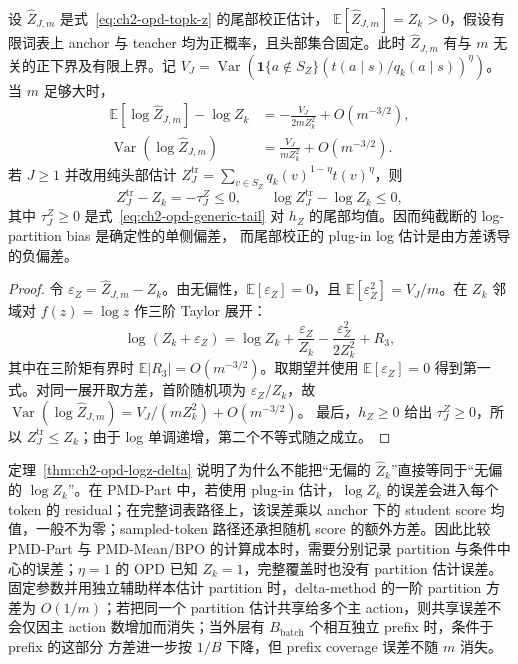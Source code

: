 \documentclass[lang=cn,scheme=chinese,openany]{../book/elegantbook}
\begin{document}
\begin{theorem}
\label{thm:ch2-opd-logz-delta}
设 $\widehat Z_{J,m}$ 是式~\eqref{eq:ch2-opd-topk-z} 的尾部校正估计， $\mathbb E[\widehat Z_{J,m}]=Z_k>0$，假设有限词表上 anchor 与 teacher 均为正概率，且头部集合固定。此时 $\widehat Z_{J,m}$ 有与 $m$ 无关的正下界及有限上界。记 $V_{J}=\operatorname{Var}(\mathbf 1\{a\notin S_Z\} (t(a\mid s)/q_k(a\mid s))^\eta)$。当 $m$ 足够大时，
\begin{align}
\mathbb E[\log\widehat Z_{J,m}]-\log Z_k
&=-\frac{V_J}{2mZ_k^2}+O(m^{-3/2}),\\
\operatorname{Var}(\log\widehat Z_{J,m})
&=\frac{V_J}{mZ_k^2}+O(m^{-3/2}).
\end{align}
若 $J\ge1$ 并改用纯头部估计 $Z_J^{\mathrm{tr}}=\sum_{v\in S_Z} q_k(v)^{1-\eta}t(v)^\eta$，则
\begin{equation}
Z_J^{\mathrm{tr}}-Z_k=-\tau_J^Z\le0,
\qquad
\log Z_J^{\mathrm{tr}}-\log Z_k\le0,
\end{equation}
其中 $\tau_J^Z\ge0$ 是式~\eqref{eq:ch2-opd-generic-tail} 对 $h_Z$ 的尾部均值。因而纯截断的 log-partition bias 是确定性的单侧偏差， 而尾部校正的 plug-in log 估计是由方差诱导的负偏差。
\end{theorem}

\begin{proof}
令 $\varepsilon_Z=\widehat Z_{J,m}-Z_k$。由无偏性，$\mathbb E[\varepsilon_Z]=0$，且 $\mathbb E[\varepsilon_Z^2]=V_J/m$。在 $Z_k$ 邻域对 $f(z)=\log z$ 作三阶 Taylor 展开：
\begin{equation}
\log(Z_k+\varepsilon_Z)=\log Z_k+\frac{\varepsilon_Z}{Z_k}
 -\frac{\varepsilon_Z^2}{2Z_k^2}+R_3,
\end{equation}
其中在三阶矩有界时 $\mathbb E|R_3|=O(m^{-3/2})$。取期望并使用 $\mathbb E[\varepsilon_Z]=0$ 得到第一式。对同一展开取方差，首阶随机项为 $\varepsilon_Z/Z_k$，故 $\operatorname{Var}(\log\widehat Z_{J,m})=V_J/(mZ_k^2)+O(m^{-3/2})$。 最后，$h_Z\ge0$ 给出 $\tau_J^Z\ge0$，所以 $Z_J^{\mathrm{tr}}\le Z_k$；由于 log 单调递增，第二个不等式随之成立。
\end{proof}

定理~\ref{thm:ch2-opd-logz-delta} 说明了为什么不能把“无偏的 $\widehat Z_k$”直接等同于“无偏的 $\log Z_k$”。在 PMD-Part 中，若使用 plug-in 估计，$\log Z_k$ 的误差会进入每个 token 的 residual；在完整词表路径上，该误差乘以 anchor 下的 student score 均值，一般不为零；sampled-token 路径还承担随机 score 的额外方差。因此比较 PMD-Part 与 PMD-Mean/BPO 的计算成本时，需要分别记录 partition 与条件中心的误差；$\eta=1$ 的 OPD 已知 $Z_k=1$，完整覆盖时也没有 partition 估计误差。 固定参数并用独立辅助样本估计 partition 时，delta-method 的一阶 partition 方差为 $O(1/m)$；若把同一个 partition 估计共享给多个主 action，则共享误差不会仅因主 action 数增加而消失；当外层有 $B_{\mathrm{batch}}$ 个相互独立 prefix 时，条件于 prefix 的这部分 方差进一步按 $1/B$ 下降，但 prefix coverage 误差不随 $m$ 消失。
\end{document}
